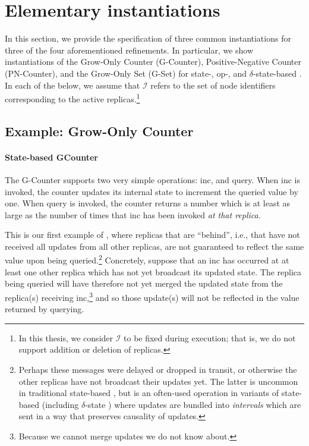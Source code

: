\section{Elementary \CRDT instantiations}
\label{sec:crdt-portfolio}
In this section, we provide the specification of three common \CRDT instantiations
for three of the four aforementioned \CRDT refinements. In particular, we show
instantiations of the Grow-Only Counter (G-Counter), Positive-Negative Counter
(PN-Counter), and the Grow-Only Set (G-Set) for state-, op-, and
$\delta$-state-based \CRDTs. In each of the below, we assume that $\mathcal{I}$
refers to the set of node identifiers corresponding to the active
replicas.\footnote{In this thesis, we consider $\mathcal{I}$ to be fixed during
execution; that is, we do not support addition or deletion of replicas.}

\subsection{Example: Grow-Only Counter}
\label{sec:example-gcounter}

\paragraph{State-based GCounter}
The G-Counter supports two very simple operations: \textsf{inc}, and query. When
\textsf{inc} is invoked, the counter updates its internal state to increment the
queried value by one. When query is invoked, the counter returns a number which
is at least as large as the number of times that \textsf{inc} has been invoked
\textit{at that replica}.

This is our first example of \SEC, where replicas that are ``behind'', i.e.,
that have not received all updates from all other replicas, are not guaranteed
to reflect the same value upon being queried.\footnote{Perhaps these messages
were delayed or dropped in transit, or otherwise the other replicas have not
broadcast their updates yet. The latter is uncommon in traditional state-based
\CRDTs, but is an often-used operation in variants of state-based \CRDTs
(including $\delta$-state \CRDTs) where updates are bundled into
\emph{intervals} which are sent in a way that preserves causality of updates.}
Concretely, suppose that an \textsf{inc} has occurred at at least one other
replica which has not yet broadcast its updated state. The replica being queried
will have therefore not yet merged the updated state from the replica(s)
receiving \textsf{inc},\footnote{Because we cannot merge updates we do not know
about.} and so those update(s) will not be reflected in the value returned by
querying.

